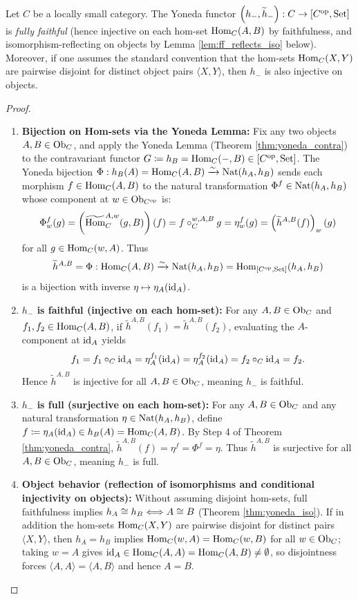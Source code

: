 \documentclass[10pt,a4paper]{article}
\renewcommand{\myprf}{\begin{proof}}
\renewcommand{\myqed}{\end{proof}}
\begin{document}
\begin{theorem}\label{thm:yoneda_emb}
Let $C$ be a locally small category. The Yoneda functor $\left(h_-, \widetilde{h}_-\right) : C \to [C^{\textrm{op}}, {\textrm{Set}}]$ is \emph{fully faithful} (hence injective on each hom-set ${\textrm{Hom}}_C(A, B)$ by faithfulness, and isomorphism-reflecting on objects by Lemma \ref{lem:ff_reflects_iso} below). Moreover, if one assumes the standard convention that the hom-sets ${\textrm{Hom}}_C(X, Y)$ are pairwise disjoint for distinct object pairs $\langle X, Y \rangle$, then $h_-$ is also injective on objects.
\end{theorem}
\myprf
\begin{enumerate}
\item \textbf{Bijection on Hom-sets via the Yoneda Lemma:}
Fix any two objects $A, B \in {\textrm{Ob}}_C$, and apply the Yoneda Lemma (Theorem \ref{thm:yoneda_contra}) to the contravariant functor $G \coloneqq h_B = {\textrm{Hom}}_C(-,B) \in [C^{\textrm{op}}, {\textrm{Set}}]$.
The Yoneda bijection $\Phi : h_B(A) = {\textrm{Hom}}_C(A,B) \xrightarrow{\sim} {\textrm{Nat}}(h_A, h_B)$ sends each morphism $f \in {\textrm{Hom}}_C(A,B)$ to the natural transformation $\Phi^f \in {\textrm{Nat}}(h_A, h_B)$ whose component at $w \in {\textrm{Ob}}_{C^{\textrm{op}}}$ is:
$$\Phi^f_w(g) = \left({\widetilde{{\textrm{Hom}}}\textrm{}}_C^{A,w}(g, B)\right)(f) = f \circ_C^{w,A,B} g = \eta^f_w(g) = \left(\widetilde{h}^{A,B}(f)\right)_w(g)$$
for all $g \in {\textrm{Hom}}_C(w,A)$. Thus
$$\widetilde{h}^{A,B} = \Phi : {\textrm{Hom}}_C(A,B) \xrightarrow{\sim} {\textrm{Nat}}(h_A, h_B) = {\textrm{Hom}}_{[C^{\textrm{op}},{\textrm{Set}}]}(h_A, h_B)$$
is a bijection with inverse $\eta \mapsto \eta_A({\textrm{id}}_A)$.

\item \textbf{$h_-$ is faithful (injective on each hom-set):}
For any $A, B \in {\textrm{Ob}}_C$ and $f_1, f_2 \in {\textrm{Hom}}_C(A,B)$, if $\widetilde{h}^{A,B}(f_1) = \widetilde{h}^{A,B}(f_2)$, evaluating the $A$-component at ${\textrm{id}}_A$ yields
$$f_1 = f_1 \circ_C {\textrm{id}}_A = \eta^{f_1}_A({\textrm{id}}_A) = \eta^{f_2}_A({\textrm{id}}_A) = f_2 \circ_C {\textrm{id}}_A = f_2.$$
Hence $\widetilde{h}^{A,B}$ is injective for all $A,B \in {\textrm{Ob}}_C$, meaning $h_-$ is faithful.

\item \textbf{$h_-$ is full (surjective on each hom-set):}
For any $A, B \in {\textrm{Ob}}_C$ and any natural transformation $\eta \in {\textrm{Nat}}(h_A, h_B)$, define $f \coloneqq \eta_A({\textrm{id}}_A) \in h_B(A) = {\textrm{Hom}}_C(A,B)$. By Step 4 of Theorem \ref{thm:yoneda_contra}, $\widetilde{h}^{A,B}(f) = \eta^f = \Phi^f = \eta$. Thus $\widetilde{h}^{A,B}$ is surjective for all $A,B \in {\textrm{Ob}}_C$, meaning $h_-$ is full.

\item \textbf{Object behavior (reflection of isomorphisms and conditional injectivity on objects):}
Without assuming disjoint hom-sets, full faithfulness implies $h_A \cong h_B \Longleftrightarrow A \cong B$ (Theorem \ref{thm:yoneda_iso}). If in addition the hom-sets ${\textrm{Hom}}_C(X,Y)$ are pairwise disjoint for distinct pairs $\langle X, Y \rangle$, then $h_A = h_B$ implies ${\textrm{Hom}}_C(w,A) = {\textrm{Hom}}_C(w,B)$ for all $w \in {\textrm{Ob}}_C$; taking $w = A$ gives ${\textrm{id}}_A \in {\textrm{Hom}}_C(A,A) = {\textrm{Hom}}_C(A,B) \neq \emptyset$, so disjointness forces $\langle A, A \rangle = \langle A, B \rangle$ and hence $A = B$.
\end{enumerate}
\myqed
\end{document}
